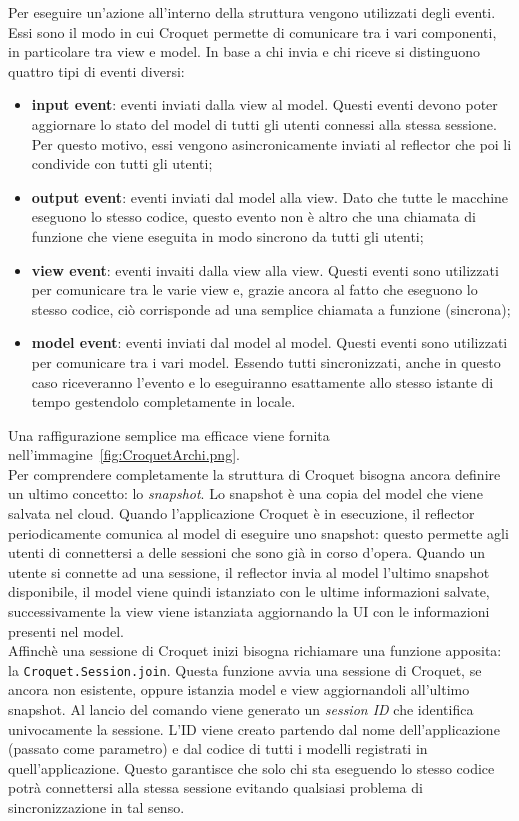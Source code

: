 \newline
Per eseguire un'azione all'interno della struttura vengono utilizzati degli eventi. Essi sono il modo in cui Croquet permette di comunicare tra i vari componenti, in particolare
tra view e model. In base a chi invia e chi riceve si distinguono quattro tipi di eventi diversi:
\begin{itemize}
    \item \textbf{input event}: eventi inviati dalla view al model. Questi eventi devono poter aggiornare lo stato del model di tutti gli utenti connessi alla stessa sessione. Per 
    questo motivo, essi vengono asincronicamente inviati al reflector che poi li condivide con tutti gli utenti;
    \item \textbf{output event}: eventi inviati dal model alla view. Dato che tutte le macchine eseguono lo stesso codice, questo evento non è altro che una chiamata di funzione
    che viene eseguita in modo sincrono da tutti gli utenti;
    \item \textbf{view event}: eventi invaiti dalla view alla view. Questi eventi sono utilizzati per comunicare tra le varie view e, grazie ancora al fatto che eseguono lo stesso codice,
    ciò corrisponde ad una semplice chiamata a funzione (sincrona);
    \item \textbf{model event}: eventi inviati dal model al model. Questi eventi sono utilizzati per comunicare tra i vari model. Essendo tutti sincronizzati, anche in questo caso
    riceveranno l'evento e lo eseguiranno esattamente allo stesso istante di tempo gestendolo completamente in locale.
\end{itemize}
Una raffigurazione semplice ma efficace viene fornita nell'immagine~\ref{fig:CroquetArchi.png}.\\
\newline
{}
Per comprendere completamente la struttura di Croquet bisogna ancora definire un ultimo concetto: lo \textit{snapshot}. Lo snapshot è una copia del model che viene salvata nel cloud.
Quando l'applicazione Croquet è in esecuzione, il reflector periodicamente comunica al model di eseguire uno snapshot: questo permette agli utenti di connettersi a delle sessioni che 
sono già in corso d'opera. Quando un utente si connette ad una sessione, il reflector invia al model l'ultimo snapshot disponibile, il model viene quindi istanziato con le ultime
informazioni salvate, successivamente la view viene istanziata aggiornando la UI con le informazioni presenti nel model.\\
\newline
Affinchè una sessione di Croquet inizi bisogna richiamare una funzione apposita: la \texttt{Croquet.Session.join}. Questa funzione avvia una sessione di Croquet, se ancora non esistente,
oppure istanzia model e view aggiornandoli all'ultimo snapshot. Al lancio del comando viene generato un \textit{session ID} che identifica univocamente la sessione. L'ID viene 
creato partendo dal nome dell'applicazione (passato come parametro) e dal codice di tutti i modelli registrati in quell'applicazione. Questo garantisce che solo chi sta eseguendo lo
stesso codice potrà connettersi alla stessa sessione evitando qualsiasi problema di sincronizzazione in tal senso.
